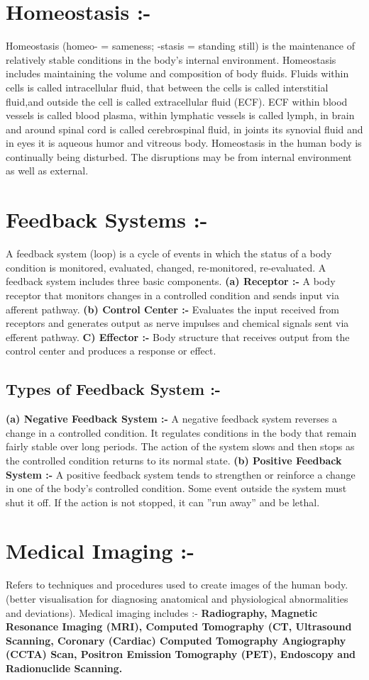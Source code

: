 \documentclass[12pt]{article}
\begin{document}
\begin{small}
\section{Homeostasis :- }
Homeostasis (homeo- = sameness; -stasis = standing still) is the maintenance of
relatively stable conditions in the body’s internal environment. Homeostasis includes maintaining the volume and composition of body fluids. Fluids within cells is called intracellular fluid, that between the cells is called interstitial fluid,and outside the cell is called extracellular fluid (ECF). ECF within blood vessels is called blood plasma, within lymphatic vessels is called lymph, in brain and around spinal cord is called cerebrospinal fluid, in joints its synovial fluid and in eyes it is aqueous humor and vitreous body. Homeostasis in the human body is continually being disturbed. The disruptions may be from internal environment as well as external.

\section{Feedback Systems :-}
A feedback system (loop) is a cycle of events in which the status of a body condition is monitored, evaluated, changed, re-monitored, re-evaluated. A feedback system includes three basic components.
\textbf{(a) Receptor :-} A body receptor that monitors changes in a controlled condition and
sends input via afferent pathway.
\textbf{(b) Control Center :-} Evaluates the input received from receptors and generates output as nerve impulses and chemical signals sent via efferent pathway.
\textbf{C) Effector :-} Body structure that receives output from the control center and produces a response or effect.

\subsection{Types of Feedback System :- }
\textbf{(a) Negative Feedback System :-} A negative feedback system reverses a change in a
controlled condition. It regulates conditions in the body that remain fairly stable over
long periods. The action of the system slows and then stops as the controlled condition
returns to its normal state.
\textbf{(b) Positive Feedback System :-} A positive feedback system tends to strengthen or
reinforce a change in one of the body’s controlled condition. Some event outside the
system must shut it off. If the action is not stopped, it can ”run away” and be lethal.

\section{Medical Imaging :- }
Refers to techniques and procedures used to create images of the human body.(better
visualisation for diagnosing anatomical and physiological abnormalities and deviations).
Medical imaging includes :- \textbf{Radiography, Magnetic Resonance Imaging (MRI),
Computed Tomography (CT, Ultrasound Scanning, Coronary (Cardiac) Computed
Tomography Angiography (CCTA) Scan, Positron Emission Tomography (PET),
Endoscopy and Radionuclide Scanning.}
\end{small}
\end{document}
